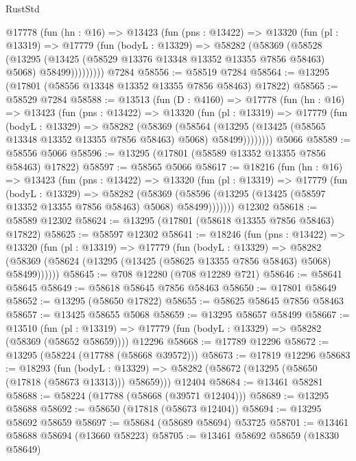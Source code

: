 \begin{lexlean}{RustStd}
\begin{coremodule}
      @17778
        (fun (hn : @16) =>
        @13423
          (fun (pns : @13422) =>
          @13320
            (fun (pl : @13319) =>
            @17779
              (fun (bodyL : @13329) =>
              @58282
                (@58369
                  (@58528
                    (@13295
                      (@13425 (@58529 @13376 @13348 @13352 @13355 @7856 @58463) @5068)
                      @58499)))))))))
    @7284
@58556 := @58519 @7284
@58564 := @13295 (@17801 (@58556 @13348 @13352 @13355 @7856 @58463) @17822)
@58565 := @58529 @7284
@58588 := @13513
    (fun (D : @4160) =>
    @17778
      (fun (hn : @16) =>
      @13423
        (fun (pns : @13422) =>
        @13320
          (fun (pl : @13319) =>
          @17779
            (fun (bodyL : @13329) =>
            @58282
              (@58369
                (@58564
                  (@13295 (@13425 (@58565 @13348 @13352 @13355 @7856 @58463) @5068) @58499))))))))
    @5066
@58589 := @58556 @5066
@58596 := @13295 (@17801 (@58589 @13352 @13355 @7856 @58463) @17822)
@58597 := @58565 @5066
@58617 := @18216
    (fun (hn : @16) =>
    @13423
      (fun (pns : @13422) =>
      @13320
        (fun (pl : @13319) =>
        @17779
          (fun (bodyL : @13329) =>
          @58282
            (@58369 (@58596 (@13295 (@13425 (@58597 @13352 @13355 @7856 @58463) @5068) @58499)))))))
    @12302
@58618 := @58589 @12302
@58624 := @13295 (@17801 (@58618 @13355 @7856 @58463) @17822)
@58625 := @58597 @12302
@58641 := @18246
    (fun (pns : @13422) =>
    @13320
      (fun (pl : @13319) =>
      @17779
        (fun (bodyL : @13329) =>
        @58282 (@58369 (@58624 (@13295 (@13425 (@58625 @13355 @7856 @58463) @5068) @58499))))))
@58645 := @708 @12280 (@708 @12289 @721)
@58646 := @58641 @58645
@58649 := @58618 @58645 @7856 @58463
@58650 := @17801 @58649
@58652 := @13295 (@58650 @17822)
@58655 := @58625 @58645 @7856 @58463
@58657 := @13425 @58655 @5068
@58659 := @13295 @58657 @58499
@58667 := @13510
    (fun (pl : @13319) => @17779 (fun (bodyL : @13329) => @58282 (@58369 (@58652 @58659))))
    @12296
@58668 := @17789 @12296
@58672 := @13295 (@58224 (@17788 (@58668 @39572)))
@58673 := @17819 @12296
@58683 := @18293
    (fun (bodyL : @13329) => @58282 (@58672 (@13295 (@58650 (@17818 (@58673 @13313))) @58659)))
    @12404
@58684 := @13461 @58281
@58688 := @58224 (@17788 (@58668 (@39571 @12404)))
@58689 := @13295 @58688
@58692 := @58650 (@17818 (@58673 @12404))
@58694 := @13295 @58692 @58659
@58697 := @58684 (@58689 @58694) @53725
@58701 := @13461 @58688 @58694 (@13660 @58223)
@58705 := @13461 @58692 @58659 (@18330 @58649)

\end{coremodule}
\end{lexlean}

